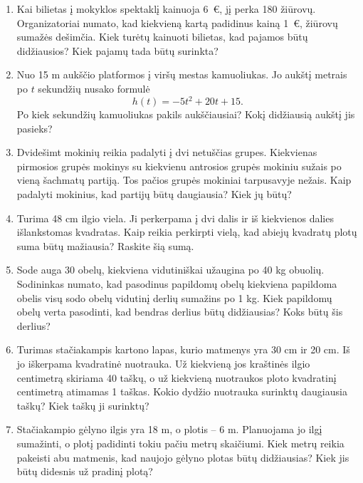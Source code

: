 \documentclass[11pt,a4paper]{article}
\begin{document}
\begin{enumerate}[start=3]
\item \begin{minipage}[t]{\linewidth}Kai bilietas į mokyklos spektaklį kainuoja 6~€, jį perka 180 žiūrovų. Organizatoriai numato, kad kiekvieną kartą padidinus kainą 1~€, žiūrovų sumažės dešimčia. Kiek turėtų kainuoti bilietas, kad pajamos būtų didžiausios? Kiek pajamų tada būtų surinkta?\end{minipage}
\item \begin{minipage}[t]{\linewidth}Nuo 15 m aukščio platformos į viršų mestas kamuoliukas. Jo aukštį metrais po $t$ sekundžių nusako formulė
\[h(t)=-5t^2+20t+15.\]
Po kiek sekundžių kamuoliukas pakils aukščiausiai? Kokį didžiausią aukštį jis pasieks?\end{minipage}
\item \begin{minipage}[t]{\linewidth}Dvidešimt mokinių reikia padalyti į dvi netuščias grupes. Kiekvienas pirmosios grupės mokinys su kiekvienu antrosios grupės mokiniu sužais po vieną šachmatų partiją. Tos pačios grupės mokiniai tarpusavyje nežais. Kaip padalyti mokinius, kad partijų būtų daugiausia? Kiek jų būtų?\end{minipage}
\item \begin{minipage}[t]{\linewidth}Turima 48 cm ilgio viela. Ji perkerpama į dvi dalis ir iš kiekvienos dalies išlankstomas kvadratas. Kaip reikia perkirpti vielą, kad abiejų kvadratų plotų suma būtų mažiausia? Raskite šią sumą.\end{minipage}
\item \begin{minipage}[t]{\linewidth}Sode auga 30 obelų, kiekviena vidutiniškai užaugina po 40 kg obuolių. Sodininkas numato, kad pasodinus papildomų obelų kiekviena papildoma obelis visų sodo obelų vidutinį derlių sumažins po 1 kg. Kiek papildomų obelų verta pasodinti, kad bendras derlius būtų didžiausias? Koks būtų šis derlius?\end{minipage}
\item \begin{minipage}[t]{\linewidth}Turimas stačiakampis kartono lapas, kurio matmenys yra 30 cm ir 20 cm. Iš jo iškerpama kvadratinė nuotrauka. Už kiekvieną jos kraštinės ilgio centimetrą skiriama 40 taškų, o už kiekvieną nuotraukos ploto kvadratinį centimetrą atimamas 1 taškas. Kokio dydžio nuotrauka surinktų daugiausia taškų? Kiek taškų ji surinktų?\end{minipage}
\item \begin{minipage}[t]{\linewidth}Stačiakampio gėlyno ilgis yra 18 m, o plotis -- 6 m. Planuojama jo ilgį sumažinti, o plotį padidinti tokiu pačiu metrų skaičiumi. Kiek metrų reikia pakeisti abu matmenis, kad naujojo gėlyno plotas būtų didžiausias? Kiek jis būtų didesnis už pradinį plotą?\end{minipage}

\end{enumerate}
\end{document}
